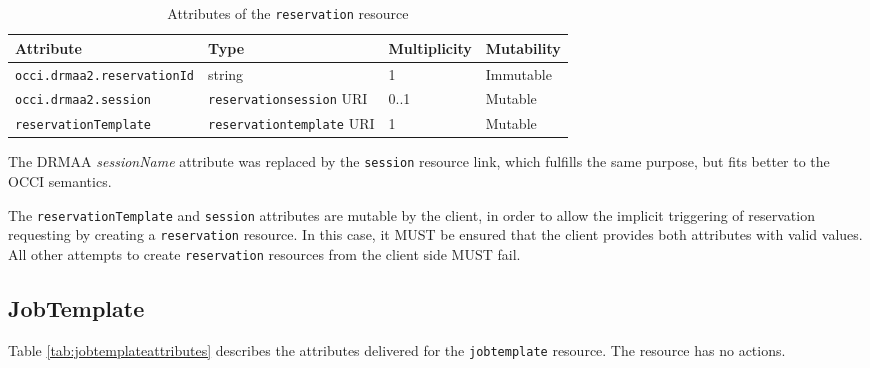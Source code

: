 \documentclass[10pt]{article}
\newcommand{\h}[1]{\lstinline|#1|}
\begin{document}
\begin{table}[ht]
\centering
\begin{tabularx}{\textwidth}{|l|X|X|X|}
\hline 
Attribute                    & Type                        & Multiplicity & Mutability \\
\hline
\h{occi.drmaa2.reservationId} & string                      & 1     & Immutable \\ %
\h{occi.drmaa2.session}       & \h{reservationsession} URI  & 0..1  & Mutable   \\ %
\h{reservationTemplate}      & \h{reservationtemplate} URI & 1     & Mutable   \\ %
\hline
\end{tabularx}
\caption{Attributes of the \h{reservation} resource}
\label{tab:reservationattributes}
\end{table}

The DRMAA \emph{sessionName} attribute was replaced by the \h{session} resource link, which fulfills the same purpose, but fits better to the OCCI semantics.

The \h{reservationTemplate} and \h{session} attributes are mutable by the client, in order to allow the implicit triggering of reservation requesting by creating a \h{reservation} resource. In this case, it MUST be ensured that the client provides both attributes with valid values. All other attempts to create \h{reservation} resources from the client side MUST fail.


\subsection{JobTemplate}

Table \ref{tab:jobtemplateattributes} describes the attributes delivered for the \h{jobtemplate} resource. The resource has no actions.
\end{document}
